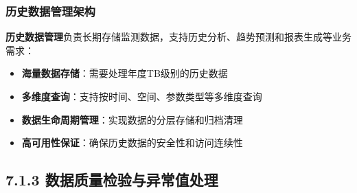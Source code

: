 {{\subsubsection{历史数据管理架构}\label{ux5386ux53f2ux6570ux636eux7ba1ux7406ux67b6ux6784}
\textbf{历史数据管理}负责长期存储监测数据，支持历史分析、趋势预测和报表生成等业务需求： \begin{itemize} \tightlist \item \textbf{海量数据存储}：需要处理年度TB级别的历史数据 \item
\textbf{多维度查询}：支持按时间、空间、参数类型等多维度查询 \item \textbf{数据生命周期管理}：实现数据的分层存储和归档清理 \item \textbf{高可用性保证}：确保历史数据的安全性和访问连续性
\end{itemize} \subsection{7.1.3
数据质量检验与异常值处理}\label{ux6570ux636eux8d28ux91cfux68c0ux9a8cux4e0eux5f02ux5e38ux503cux5904ux7406}
}}

